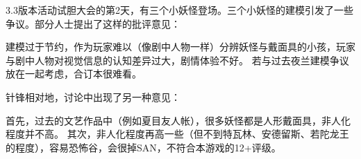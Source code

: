 \clearpage
\dividearticles

\begin{multicols}{2}
	3.3版本活动试胆大会的第2天，有三个小妖怪登场。三个小妖怪的建模引发了一些争议。部分人士提出了这样的批评意见：

	建模过于节约，作为玩家难以（像剧中人物一样）分辨妖怪与戴面具的小孩，玩家与剧中人物对视觉信息的认知差异过大，剧情体验不好。
	若与过去夜兰建模争议放在一起考虑，合订本很难看。

	针锋相对地，讨论中出现了另一种意见：

	首先，过去的文艺作品中（例如夏目友人帐），很多妖怪都是人形戴面具，非人化程度并不高。
	其次，非人化程度再高一些（但不到特瓦林、安德留斯、若陀龙王的程度），容易恐怖谷，会很掉SAN，不符合本游戏的12+评级。


\end{multicols}

